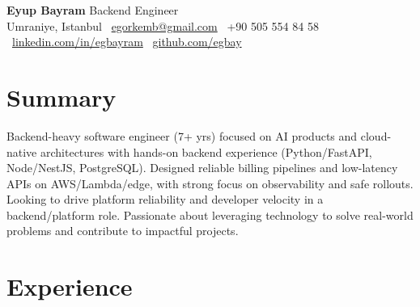 \documentclass[10pt,a4paper]{extarticle}
\begin{document}
\begin{center}
  \begin{minipage}{\textwidth}
    \centering
    {\LARGE\textbf{Eyup Bayram}} \hspace{2pt} {\LARGE Backend Engineer}\\[8pt]
    Umraniye, Istanbul \textbullet\ 
    \href{mailto:egorkemb@gmail.com}{egorkemb@gmail.com} \textbullet\
    +90 505 554 84 58 \textbullet\
    \href{https://linkedin.com/in/egbayram}{linkedin.com/in/egbayram} \textbullet\
    \href{https://github.com/egbay}{github.com/egbay}
  \end{minipage}
\end{center}

\section{Summary}
Backend-heavy software engineer (7+ yrs) focused on AI products and cloud-native architectures with hands-on backend experience (Python/FastAPI, Node/NestJS, PostgreSQL). Designed reliable billing pipelines and low-latency APIs on AWS/Lambda/edge, with strong focus on observability and safe rollouts. Looking to drive platform reliability and developer velocity in a backend/platform role. Passionate about leveraging technology to solve real-world problems and contribute to impactful projects.

\section{Experience}
\end{document}
